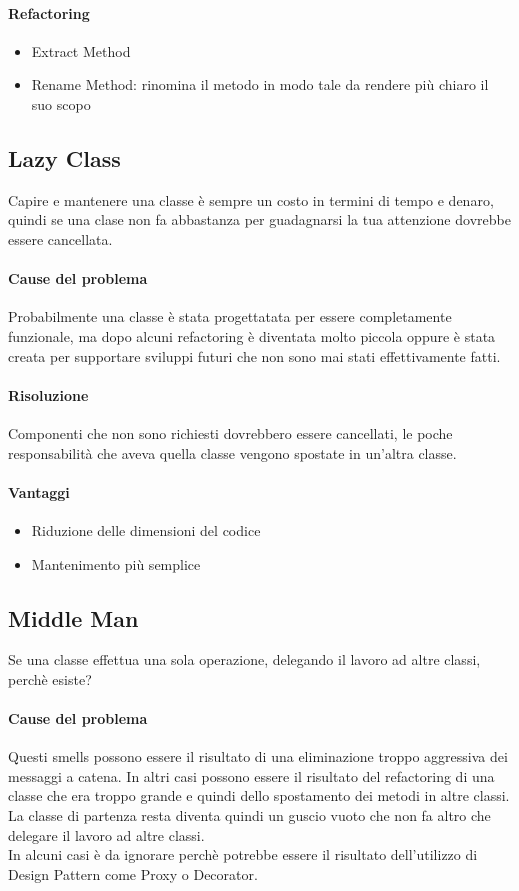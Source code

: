 \paragraph*{Refactoring}
\begin{itemize}
    \item Extract Method
    \item Rename Method: rinomina il metodo in modo tale da rendere più chiaro il suo scopo
\end{itemize}
\subsection{Lazy Class}
Capire e mantenere una classe è sempre un costo in termini di tempo e denaro,\\
quindi se una clase
non fa abbastanza per guadagnarsi la tua attenzione dovrebbe essere cancellata.\\
\paragraph*{Cause del problema}
Probabilmente una classe è stata progettatata per essere completamente funzionale, ma dopo alcuni 
refactoring è diventata molto piccola oppure è stata creata per supportare sviluppi futuri che non
sono mai stati effettivamente fatti.
\paragraph*{Risoluzione} Componenti che non sono richiesti dovrebbero essere cancellati, le poche
responsabilità che aveva quella classe vengono spostate in un'altra classe. 
\paragraph*{Vantaggi}
\begin{itemize}
    \item Riduzione delle dimensioni del codice
    \item Mantenimento più semplice
\end{itemize}
\subsection{Middle Man}
Se una classe effettua una sola operazione, delegando il lavoro ad altre classi, perchè esiste?
\paragraph*{Cause del problema}
Questi smells possono essere il risultato di una eliminazione troppo aggressiva dei messaggi a catena.
In altri casi possono essere il risultato del refactoring di una classe che era troppo grande e
quindi dello spostamento dei metodi in altre classi. La classe di partenza resta diventa
quindi un guscio vuoto che non fa altro che delegare il lavoro ad altre classi.\\
In alcuni casi è da ignorare perchè potrebbe essere il risultato dell'utilizzo di Design
Pattern come Proxy o Decorator.
